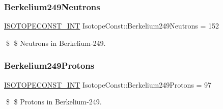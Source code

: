 \subsubsection{\texorpdfstring{Berkelium249\+Neutrons}{Berkelium249Neutrons}}
{\footnotesize\ttfamily \mbox{\hyperlink{group___isotope_const-_macros_ga5f18360b3e99483a35c32d789e62621c}{I\+S\+O\+T\+O\+P\+E\+C\+O\+N\+S\+T\+\_\+\+I\+NT}} Isotope\+Const\+::\+Berkelium249\+Neutrons = 152}

\$ \$ Neutrons in Berkelium-\/249. \mbox{\label{group___isotope_const-_berkelium-_bk249_ga9ca8051c72b0a0981de9d826defde08b}} 
\subsubsection{\texorpdfstring{Berkelium249\+Protons}{Berkelium249Protons}}
{\footnotesize\ttfamily \mbox{\hyperlink{group___isotope_const-_macros_ga5f18360b3e99483a35c32d789e62621c}{I\+S\+O\+T\+O\+P\+E\+C\+O\+N\+S\+T\+\_\+\+I\+NT}} Isotope\+Const\+::\+Berkelium249\+Protons = 97}

\$ \$ Protons in Berkelium-\/249. 